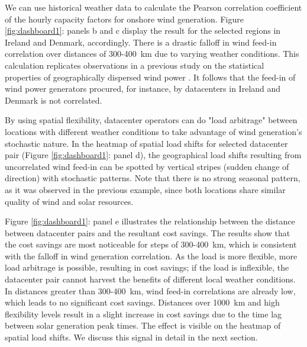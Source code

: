 We can use historical weather data to calculate the Pearson correlation coefficient of the  hourly capacity factors for onshore wind generation. Figure \ref{fig:dashboard1}: panels b and c display the result for the selected regions in Ireland and Denmark, accordingly. There is a drastic falloff in wind feed-in correlation over distances of 300-400~km due to varying weather conditions. This calculation replicates observations in a previous study on the statistical properties of geographically dispersed wind power \cite{hascheGeneralStatisticsGeographically2010}. It follows that the feed-in of wind power generators procured, for instance, by datacenters in Ireland and Denmark is not correlated.

By using spatial flexibility, datacenter operators can do "load arbitrage" between locations with different weather conditions to take advantage of wind generation's stochastic nature. In the heatmap of spatial load shifts for selected datacenter pair (Figure \ref{fig:dashboard1}: panel d), the geographical load shifts resulting from uncorrelated wind feed-in can be spotted by vertical stripes (sudden change of direction) with stochastic patterns. Note that there is no strong seasonal pattern, as it was observed in the previous example, since both locations share similar quality of wind and solar resources.

Figure \ref{fig:dashboard1}: panel e illustrates the relationship between the distance between datacenter pairs and the resultant cost savings. The results show that the cost savings are most noticeable for steps of 300-400~km, which is consistent with the falloff in wind generation correlation. As the load is more flexible, more load arbitrage is possible, resulting in cost savings; if the load is inflexible, the datacenter pair cannot harvest the benefits of different local weather conditions. In distances greater than 300-400~km, wind feed-in correlations are already low, which leads to no significant cost savings. Distances over 1000~km and high flexibility levels result in a slight increase in cost savings due to the time lag between solar generation peak times.  The effect is visible on the heatmap of spatial load shifts. We discuss this signal in detail in the next section.

